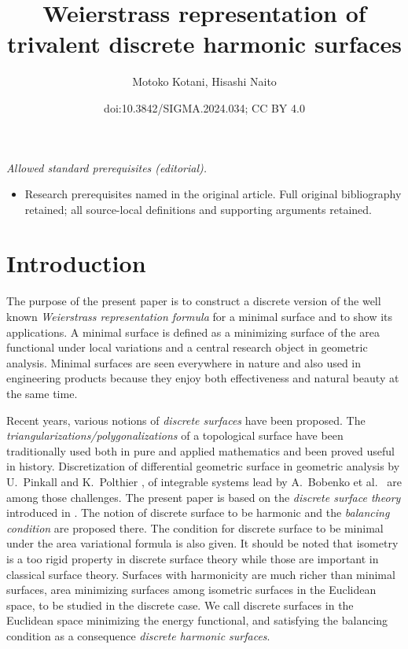 \documentclass[10pt,a4paper]{amsart}
\title{Weierstrass representation of trivalent discrete harmonic surfaces}
\author{Motoko Kotani, Hisashi Naito}
\date{doi:10.3842/SIGMA.2024.034; CC BY 4.0}
\newcommand{\1}{{\bf 1}}
\numberwithin{equation}{section}
\begin{document}
\maketitle
\noindent\textit{Allowed standard prerequisites (editorial).}\begin{itemize}
\item Research prerequisites named in the original article. Full original bibliography retained; all source-local definitions and supporting arguments retained.
\end{itemize}\medskip
\section{Introduction}
The purpose of the present paper is to construct a discrete version of the well known
{\em Weierstrass representation formula} for a minimal surface and to show its applications.
A minimal surface is defined as a minimizing surface of the area functional under local variations
and a central research object in geometric analysis.
Minimal surfaces are seen everywhere in nature and also used in engineering products
because they enjoy both effectiveness and natural beauty at the same time.

Recent years, various notions of {\em discrete surfaces} have been proposed.
The {\em triangularizations/polygonalizations} of a topological surface have been traditionally used
both in pure and applied mathematics and been proved useful in history.
Discretization of differential geometric surface in geometric analysis by U.~Pinkall and K.~Polthier
\cite{bobenko-pinkall, pinkall-polthier}, of integrable systems lead by A.~Bobenko et al.\
\cite{bobenko-bucking-sechelmann, bobenko-hoffmann, bobenko-pottmann-wallner}
are among those challenges.
The present paper is based on the {\em discrete surface theory} introduced in \cite{kotani-naito-omori}.
The notion of discrete surface to be harmonic and the {\em balancing condition} are proposed there.
The condition for discrete surface to be minimal under the area variational formula is also given.
It should be noted that isometry is a too rigid property in discrete surface theory while those are important in classical surface theory.
Surfaces with harmonicity are much richer than minimal surfaces,
area minimizing surfaces among isometric surfaces in the Euclidean space, to be studied in the discrete case.
We call discrete surfaces in the Euclidean space minimizing the energy functional,
and satisfying the balancing condition as a consequence {\em discrete harmonic surfaces}.
\end{document}
